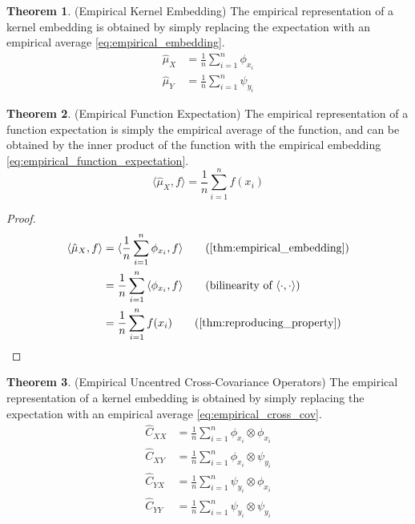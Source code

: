 \documentclass[twoside]{article} \usepackage{aistats2017}
\theoremstyle{definition}
\newtheorem{theorem}{Theorem}[section]
\newcommand{\rv}[1]{{#1}}
\newcommand{\inner}[2]{{\langle #1, #2 \rangle}}
\newcommand{\hatmuX}{\hat{\mu}_{\rv{X}}}
\newcommand{\hatmuY}{\hat{\mu}_{\rv{Y}}}
\newcommand{\hatCxy}{\hat{C}_{\rv{X} \rv{Y}}}
\newcommand{\hatCyx}{\hat{C}_{\rv{Y} \rv{X}}}
\newcommand{\hatCxx}{\hat{C}_{\rv{X} \rv{X}}}
\newcommand{\hatCyy}{\hat{C}_{\rv{Y} \rv{Y}}}
\begin{document}
		\begin{theorem} \label{thm:empirical_embedding}
			(Empirical Kernel Embedding)
			The empirical representation of a kernel embedding is obtained by simply replacing the expectation with an empirical average \eqref{eq:empirical_embedding}.
			\begin{equation}
			\begin{aligned}
				\hatmuX &= \frac{1}{n} \sum_{i = 1}^{n} \phi_{x_{i}} \\
				\hatmuY &= \frac{1}{n} \sum_{i = 1}^{n} \psi_{y_{i}}
			\label{eq:empirical_embedding}
			\end{aligned}
			\end{equation}
		\end{theorem}
	
		\begin{theorem} \label{thm:empirical_function_expectation}
			(Empirical Function Expectation)
			The empirical representation of a function expectation is simply the empirical average of the function, and can be obtained by the inner product of the function with the empirical embedding \eqref{eq:empirical_function_expectation}.
			\begin{equation}
				\inner{\hatmuX}{f} = \frac{1}{n} \sum_{i = 1}^{n} f(x_{i})
				\label{eq:empirical_function_expectation}
			\end{equation}
			
			\begin{proof}
				\begin{align*}
					\inner{\hatmuX}{f} &= \inner{\frac{1}{n} \sum_{i = 1}^{n} \phi_{x_{i}}}{f} \tag{\cref{thm:empirical_embedding}} \\
					&= \frac{1}{n} \sum_{i = 1}^{n} \inner{\phi_{x_{i}}}{f} \tag{bilinearity of $\inner{\cdot}{\cdot}$} \\
					&= \frac{1}{n} \sum_{i = 1}^{n} f(x_{i}) \tag{\cref{thm:reproducing_property}}
				\end{align*}
			\end{proof}
		\end{theorem}
		
		\begin{theorem} \label{thm:empirical_cross_cov}
			(Empirical Uncentred Cross-Covariance Operators)
			The empirical representation of a kernel embedding is obtained by simply replacing the expectation with an empirical average \eqref{eq:empirical_cross_cov}.
			\begin{equation}
			\begin{aligned}
				\hatCxx &= \frac{1}{n} \sum_{i = 1}^{n} \phi_{x_{i}} \otimes \phi_{x_{i}} \\
				\hatCxy &= \frac{1}{n} \sum_{i = 1}^{n} \phi_{x_{i}} \otimes \psi_{y_{i}} \\
				\hatCyx &= \frac{1}{n} \sum_{i = 1}^{n} \psi_{y_{i}} \otimes \phi_{x_{i}} \\
				\hatCyy &= \frac{1}{n} \sum_{i = 1}^{n} \psi_{y_{i}} \otimes \psi_{y_{i}}
			\label{eq:empirical_cross_cov}
			\end{aligned}
			\end{equation}
		\end{theorem}
		
\end{document}
